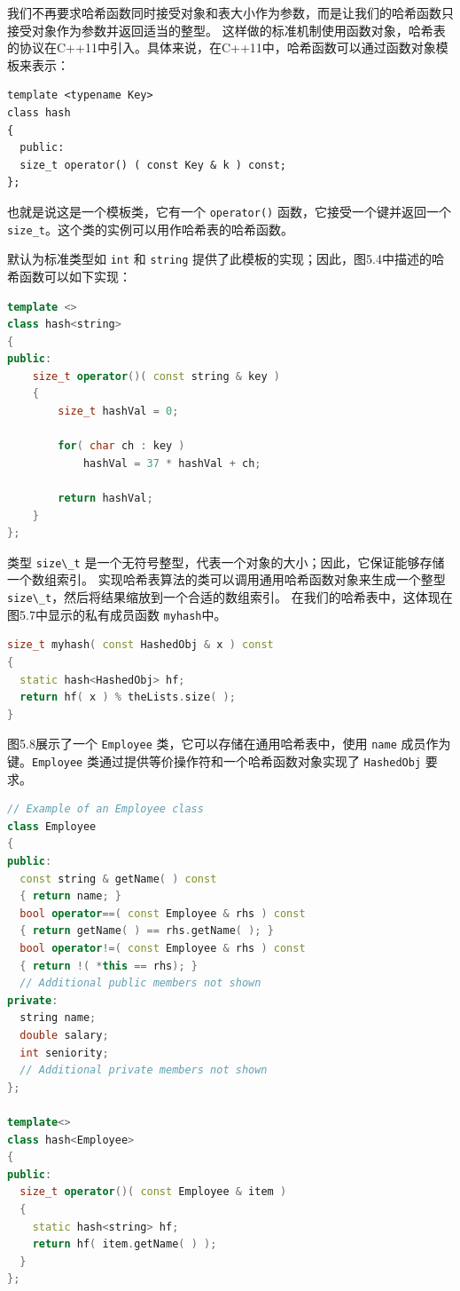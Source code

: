 \documentclass[a4paper]{ctexart}
\theoremstyle{definition}
\theoremstyle{definition}
\begin{document}
我们不再要求哈希函数同时接受对象和表大小作为参数，而是让我们的哈希函数只接受对象作为参数并返回适当的整型。
这样做的标准机制使用函数对象，哈希表的协议在C++11中引入。具体来说，在C++11中，哈希函数可以通过函数对象模板来表示：

\begin{lstlisting}
template <typename Key>
class hash
{
  public:
  size_t operator() ( const Key & k ) const;
};
\end{lstlisting}

也就是说这是一个模板类，它有一个 \verb|operator()| 函数，它接受一个键并返回一个 \verb|size_t|。这个类的实例可以用作哈希表的哈希函数。

默认为标准类型如 \verb|int| 和 \verb|string| 提供了此模板的实现；因此，图5.4中描述的哈希函数可以如下实现：

\begin{lstlisting}[language=C++]
template <>
class hash<string>
{
public:
    size_t operator()( const string & key )
    {
        size_t hashVal = 0;

        for( char ch : key )
            hashVal = 37 * hashVal + ch;

        return hashVal;
    }
};
\end{lstlisting}

类型 \verb|size\_t| 是一个无符号整型，代表一个对象的大小；因此，它保证能够存储一个数组索引。
实现哈希表算法的类可以调用通用哈希函数对象来生成一个整型 \verb|size\_t|，然后将结果缩放到一个合适的数组索引。
在我们的哈希表中，这体现在图5.7中显示的私有成员函数 \verb|myhash|中。

\begin{lstlisting}[language=C++]
size_t myhash( const HashedObj & x ) const
{
  static hash<HashedObj> hf;
  return hf( x ) % theLists.size( );
}  
\end{lstlisting}

图5.8展示了一个 \verb|Employee| 类，它可以存储在通用哈希表中，使用 \verb|name| 成员作为键。\verb|Employee|
类通过提供等价操作符和一个哈希函数对象实现了 \verb|HashedObj| 要求。

\begin{lstlisting}[language=C++]
// Example of an Employee class
class Employee
{
public:
  const string & getName( ) const
  { return name; }
  bool operator==( const Employee & rhs ) const
  { return getName( ) == rhs.getName( ); }
  bool operator!=( const Employee & rhs ) const
  { return !( *this == rhs); }
  // Additional public members not shown
private:
  string name;
  double salary;
  int seniority;
  // Additional private members not shown
};
  
template<>
class hash<Employee>
{
public:
  size_t operator()( const Employee & item )
  {
    static hash<string> hf;
    return hf( item.getName( ) );
  }
};
\end{lstlisting}
\end{document}
